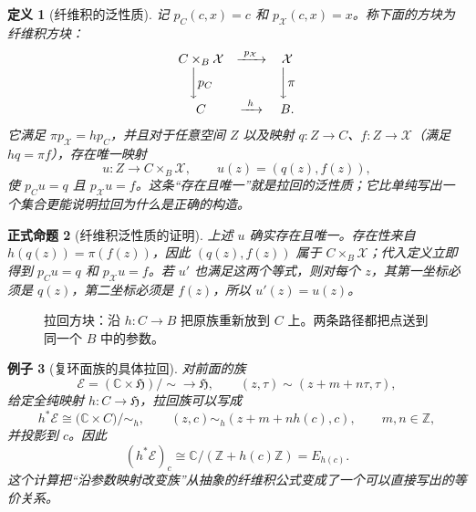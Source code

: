 \documentclass[UTF8,fontset=none,a4paper,11pt]{ctexart}
\theoremstyle{foundation-definition}
\newtheorem{definition}{定义}[section]
\theoremstyle{foundation-theorem}
\theoremstyle{foundation-proposition}
\newtheorem{proposition}[definition]{正式命题}
\theoremstyle{foundation-example}
\newtheorem{example}[definition]{例子}
\theoremstyle{foundation-remark}
\theoremstyle{foundation-theorem}
\newcommand{\C}{\mathbb C}
\newcommand{\Z}{\mathbb Z}
\begin{document}
\begin{definition}[纤维积的泛性质]\label{def:cartesian-square}
记 \(p_C(c,x)=c\) 和 \(p_{\mathcal X}(c,x)=x\)。称下面的方块为纤维积方块：
\[
\begin{array}{ccc}
C\times_B\mathcal X & \xrightarrow{\ p_{\mathcal X}\ } & \mathcal X\\
\bigg\downarrow {p_C} && \bigg\downarrow {\pi}\\
C & \xrightarrow{\ h\ } & B.
\end{array}
\]
它满足 \(\pi p_{\mathcal X}=hp_C\)，并且对于任意空间 \(Z\) 以及映射
\(q:Z\to C\)、\(f:Z\to\mathcal X\)（满足 \(h q=\pi f\)），存在唯一映射
\[
u:Z\longrightarrow C\times_B\mathcal X,
\qquad u(z)=(q(z),f(z)),
\]
使 \(p_Cu=q\) 且 \(p_{\mathcal X}u=f\)。这条“存在且唯一”就是拉回的泛性质；它比单纯写出一个集合更能说明拉回为什么是正确的构造。
\end{definition}

\begin{proposition}[纤维积泛性质的证明]
上述 \(u\) 确实存在且唯一。存在性来自
\(h(q(z))=\pi(f(z))\)，因此 \((q(z),f(z))\) 属于 \(C\times_B\mathcal X\)；代入定义立即得到
\(p_Cu=q\) 和 \(p_{\mathcal X}u=f\)。若 \(u'\) 也满足这两个等式，则对每个 \(z\)，其第一坐标必须是 \(q(z)\)，第二坐标必须是 \(f(z)\)，所以 \(u'(z)=u(z)\)。
\end{proposition}

\begin{figure}[htbp]
\centering
{}
\caption{拉回方块：沿 \(h:C\to B\) 把原族重新放到 \(C\) 上。两条路径都把点送到同一个 \(B\) 中的参数。}
\label{fig:pullback-square}
\end{figure}

\begin{example}[复环面族的具体拉回]
对前面的族
\[
\mathcal E=(\C\times\mathfrak H)/\sim\longrightarrow\mathfrak H,
\qquad
(z,\tau)\sim(z+m+n\tau,\tau),
\]
给定全纯映射 \(h:C\to\mathfrak H\)，拉回族可以写成
\[
h^*\mathcal E
\cong
\bigl(\C\times C\bigr)/\sim_h,
\qquad
(z,c)\sim_h(z+m+n h(c),c),\qquad m,n\in\mathbb Z,
\]
并投影到 \(c\)。因此
\[
(h^*\mathcal E)_c\cong\C/(\Z+h(c)\Z)=E_{h(c)}.
\]
这个计算把“沿参数映射改变族”从抽象的纤维积公式变成了一个可以直接写出的等价关系。
\end{example}
\end{document}
